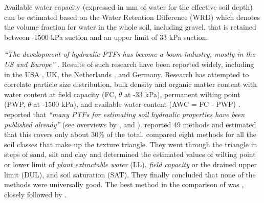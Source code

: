 \documentclass[graybox,natbib,nospthms,UStrade]{svmono}
\let\BeginKnitrBlock\begin \let\EndKnitrBlock\end
\let\BeginKnitrBlock\begin \let\EndKnitrBlock\end
\begin{document}
\BeginKnitrBlock{rmdnote}
Available water capacity (expressed in mm of water for the effective
soil depth) can be estimated based on the Water Retention Difference
(WRD) which denotes the volume fraction for water in the whole soil,
including gravel, that is retained between -1500 kPa suction and an upper limit of 33 kPa suction.
\EndKnitrBlock{rmdnote}

\emph{``The development of hydraulic PTFs has become a boom industry, mostly
in the US and Europe''} \citep{Minasny2007JITL}. Results of such research have
been reported widely, including in the USA \citep{Rawls1991AA}, UK, the
Netherlands \citep{Wosten1995G}, and Germany. Research has attempted to
correlate particle size distribution, bulk density and organic matter
content with water content at field capacity (FC, \(\theta\) at -33 kPa),
permanent wilting point (PWP, \(\theta\) at -1500 kPa), and available water content
(AWC = FC - PWP) \citep{Minasny2007JITL}. \citet{Gijsman2007CEA} reported that
\emph{``many PTFs for estimating soil hydraulic properties have been published
already''} (see overviews by \citet{Rawls1991AA}, \citet{Timlin1996AS} and
\citet{Wosten2001JH}). \citet{Timlin1996AS} reported 49 methods and estimated that
this covers only about 30\% of the total. \citet{Gijsman2007CEA} compared eight
methods for all the soil classes that make up the texture triangle. They
went through the triangle in steps of sand, silt and clay and determined
the estimated values of wilting point or lower limit of \emph{plant
extractable water} (LL), \emph{field capacity} or the drained upper limit
(DUL), and soil saturation (SAT). They finally concluded that none of
the methods were universally good. The best method in the comparison of
\citet{Gijsman2007CEA} was \citet{Saxton1986SSSAJ}, closely followed by
\citet{Rawls1982JIDDASCE}.
\end{document}
